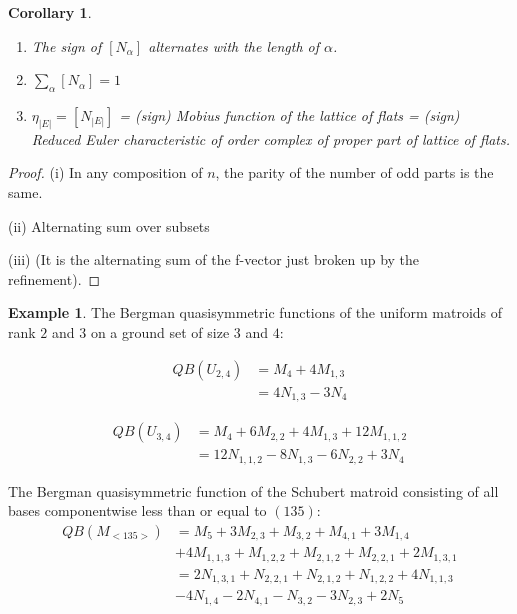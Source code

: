 \documentclass[12pt,reqno]{amsart}
\numberwithin{definition}{section}
\newtheorem{corollary}[definition]{Corollary}
\theoremstyle{definition}
\newtheorem{example}[definition]{Example}
\begin{document}
\begin{corollary}
\begin{enumerate}
\item The sign of $[N_{\alpha}]$ alternates with the length of $\alpha$.  
\item $\sum_{\alpha} [N_{\alpha}] = 1$ 
\item $\eta_{|E|} = [N_{|E|}]$ = (sign) Mobius function of the lattice
of flats = (sign) Reduced Euler characteristic of order complex of
proper part of lattice of flats.
\end{enumerate}
\end{corollary}

\begin{proof}

(i) In any composition of $n$, the parity of the number of odd parts is the same.

(ii) Alternating sum over subsets

(iii) (It is the alternating sum of the f-vector just broken up by the refinement).

\end{proof}

\begin{example}


The Bergman quasisymmetric functions of the uniform matroids of rank $2$ and $3$ on a ground set of size $3$ and $4$:

\begin{align*}
QB(U_{2,4}) & = M_4 + 4M_{1,3}\\
& = 4N_{1,3} - 3N_4
\end{align*}

\begin{align*}
QB(U_{3,4}) & =  M_4 + 6M_{2,2} + 4M_{1,3} + 12M_{1,1,2}\\
            & =  12 N_{1,1,2} - 8 N_{1,3} - 6N_{2,2} + 3N_4
\end{align*}

The Bergman quasisymmetric function of the Schubert matroid consisting of all bases componentwise less than or equal to $(135)$:
\begin{align*}
QB(M_{<135>}) & =  M_5 + 3M_{2,3} + M_{3,2} + M_{4,1} + 3M_{1,4} \\ & + 4M_{1,1,3} + M_{1,2,2} + M_{2,1,2} + M_{2,2,1} + 2M_{1,3,1}\\
&  =  2N_{1,3,1} + N_{2,2,1} + N_{2,1,2} + N_{1,2,2} + 4N_{1,1,3} \\ & - 4 N_{1,4} - 2N_{4,1} - N_{3,2} - 3N_{2,3} + 2N_5
\end{align*}

\end{example}
\end{document}
